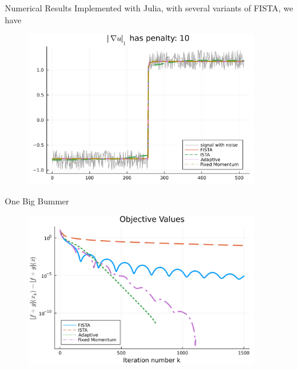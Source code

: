 \documentclass[11pt]{beamer}
\theoremstyle{definition}
\begin{document}
    \begin{frame}{Numerical Results}
        Implemented with Julia\cite{bezanson_julia_2017}, with several variants of FISTA, we have 
        \begin{figure}[H]
            \includegraphics[width=10cm]{Assets/recovered_signal.png}    
        \end{figure}
        
    \end{frame}
    \begin{frame}{One Big Bummer}
        \begin{figure}
            \includegraphics[width=10cm]{Assets/obj_vals.png}
        \end{figure}
    \end{frame}
\end{document}
